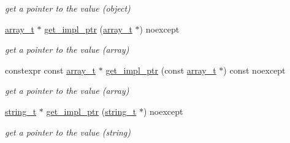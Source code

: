 \begin{DoxyCompactItemize}
\begin{DoxyCompactList}\small\item\em get a pointer to the value (object) \end{DoxyCompactList}\item 
\mbox{\label{classnlohmann_1_1basic__json_a0a9c36d4d94ef5d611c0204bc7e4d37f}} 
\mbox{\hyperlink{classnlohmann_1_1basic__json_ae095578e03df97c5b3991787f1056374}{array\+\_\+t}} $\ast$ \mbox{\hyperlink{classnlohmann_1_1basic__json_a0a9c36d4d94ef5d611c0204bc7e4d37f}{get\+\_\+impl\+\_\+ptr}} (\mbox{\hyperlink{classnlohmann_1_1basic__json_ae095578e03df97c5b3991787f1056374}{array\+\_\+t}} $\ast$) noexcept
\begin{DoxyCompactList}\small\item\em get a pointer to the value (array) \end{DoxyCompactList}\item 
\mbox{\label{classnlohmann_1_1basic__json_abefb50a81c9b91106d9ecadfcd1ee2b5}} 
constexpr const \mbox{\hyperlink{classnlohmann_1_1basic__json_ae095578e03df97c5b3991787f1056374}{array\+\_\+t}} $\ast$ \mbox{\hyperlink{classnlohmann_1_1basic__json_abefb50a81c9b91106d9ecadfcd1ee2b5}{get\+\_\+impl\+\_\+ptr}} (const \mbox{\hyperlink{classnlohmann_1_1basic__json_ae095578e03df97c5b3991787f1056374}{array\+\_\+t}} $\ast$) const noexcept
\begin{DoxyCompactList}\small\item\em get a pointer to the value (array) \end{DoxyCompactList}\item 
\mbox{\label{classnlohmann_1_1basic__json_a955d7098e5b43ee0dd8cce5f707eeb5c}} 
\mbox{\hyperlink{classnlohmann_1_1basic__json_a61f8566a1a85a424c7266fb531dca005}{string\+\_\+t}} $\ast$ \mbox{\hyperlink{classnlohmann_1_1basic__json_a955d7098e5b43ee0dd8cce5f707eeb5c}{get\+\_\+impl\+\_\+ptr}} (\mbox{\hyperlink{classnlohmann_1_1basic__json_a61f8566a1a85a424c7266fb531dca005}{string\+\_\+t}} $\ast$) noexcept
\begin{DoxyCompactList}\small\item\em get a pointer to the value (string) \end{DoxyCompactList}\item 
\mbox{\label{classnlohmann_1_1basic__json_a0c0b516e06d10dced993934ba5139cc0}} 

\end{DoxyCompactItemize}
